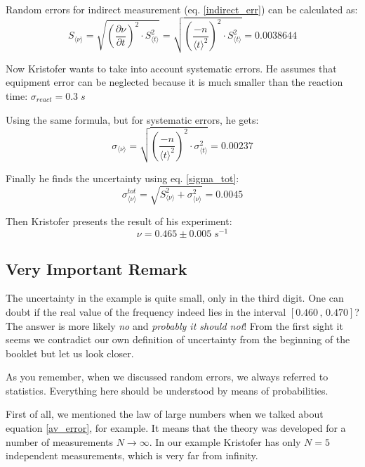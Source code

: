 \documentclass[12pt,a4paper]{article}
\begin{document}
Random errors for indirect measurement (eq. \ref{indirect_err}) can be calculated as:
\begin{equation}
S_{\langle \nu \rangle} = \sqrt{\left(\frac{\partial \nu}{\partial t}\right)^2\cdot S_{\langle t\rangle}^2} = \sqrt{\left(\frac{-n}{\langle t\rangle^2}\right)^2\cdot S_{\langle t\rangle}^2} = 0.0038644
\end{equation}

Now Kristofer wants to take into account systematic errors. He assumes that equipment error can be neglected because it is much smaller than the reaction time: $\sigma_{react} = 0.3\;s$

Using the same formula, but for systematic errors, he gets:
\begin{equation}
\sigma_{\langle \nu \rangle}  = \sqrt{\left(\frac{-n}{\langle t\rangle^2}\right)^2\cdot \sigma_{\langle t\rangle}^2} = 0.00237
\end{equation}

Finally he finds the uncertainty using eq. \ref{sigma_tot}:
\begin{equation}
\sigma_{\langle \nu \rangle}^{tot}= \sqrt{S_{\langle \nu \rangle}^2+\sigma_{\langle \nu \rangle}^2} = 0.0045
\end{equation}

Then Kristofer presents the result of his experiment:
\begin{equation}
\nu = 0.465 \pm 0.005\;s^{-1}
\end{equation}	

\subsection{Very Important Remark}
The uncertainty in the example is quite small, only in the third digit. One can doubt if the real value of the frequency indeed lies in the interval $[0.460\,,\,0.470]$? The answer is more likely \textit{no} and \textit{probably it should not}! From the first sight it seems we contradict our own definition of uncertainty from the beginning of the booklet but let us look closer.

As you remember, when we discussed random errors, we always referred to statistics. Everything here should be understood by means of probabilities.

First of all, we mentioned the law of large numbers when we talked about equation \ref{av_error}, for example. It means that the theory was developed for a number of measurements $N \rightarrow\infty$. In our example Kristofer has only $N=5$ independent measurements, which is very far from infinity.
\end{document}
